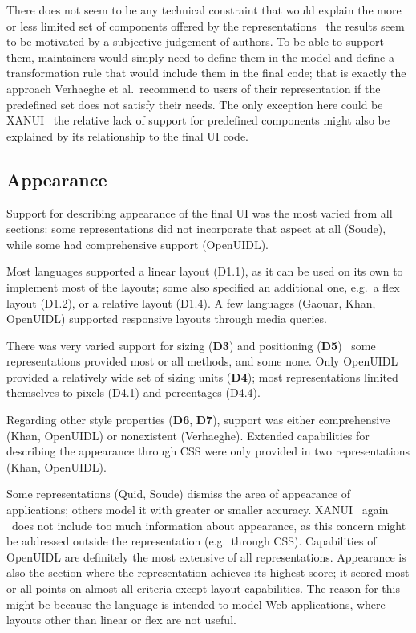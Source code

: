 There does not seem to be any technical constraint that would explain the more or less limited set of components offered by the representations \textendash\ the results seem to be motivated by a subjective judgement of authors.
To be able to support them, maintainers would simply need to define them in the model and define a transformation rule that would include them in the final code;
that is exactly the approach Verhaeghe et al.\ recommend to users of their representation if the predefined set does not satisfy their needs.
The only exception here could be XANUI \textendash\ the relative lack of support for predefined components might also be explained by its relationship to the final UI code.

\subsection{Appearance}\label{subsec:4-2-appearance}
Support for describing appearance of the final UI was the most varied from all sections: some representations did not incorporate that aspect at all (Soude), while some had comprehensive support (OpenUIDL).

Most languages supported a linear layout (D1.1), as it can be used on its own to implement most of the layouts;
some also specified an additional one, e.g.\ a flex layout (D1.2), or a relative layout (D1.4).
A few languages (Gaouar, Khan, OpenUIDL) supported responsive layouts through media queries.

There was very varied support for sizing (\textbf{D3}) and positioning (\textbf{D5}) \textendash\ some representations provided most or all methods, and some none.
Only OpenUIDL provided a relatively wide set of sizing units (\textbf{D4});
most representations limited themselves to pixels (D4.1) and percentages (D4.4).

Regarding other style properties (\textbf{D6}, \textbf{D7}), support was either comprehensive (Khan, OpenUIDL) or nonexistent (Verhaeghe).
Extended capabilities for describing the appearance through CSS were only provided in two representations (Khan, OpenUIDL).

Some representations (Quid, Soude) dismiss the area of appearance of applications;
others model it with greater or smaller accuracy.
XANUI \textendash\ again \textendash\ does not include too much information about appearance, as this concern might be addressed outside the representation (e.g.\ through CSS).
Capabilities of OpenUIDL are definitely the most extensive of all representations.
Appearance is also the section where the representation achieves its highest score;
it scored most or all points on almost all criteria except layout capabilities.
The reason for this might be because the language is intended to model Web applications, where layouts other than linear or flex are not useful.

